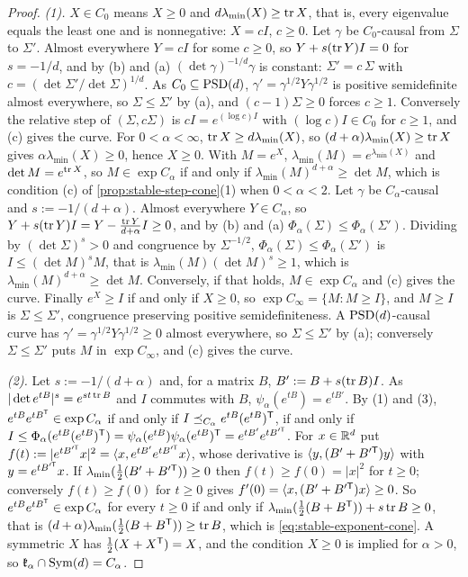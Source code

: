 \begin{proof}
\emph{(1).} $X \in C_0$ means $X \ge 0$ and $d\lambda_{\min}(X) \ge \operatorname{tr} X$, that is, every eigenvalue equals the
least one and is nonnegative: $X = cI$, $c \ge 0$. Let $\gamma$ be $C_0$-causal from $\Sigma$ to $\Sigma'$.
Almost everywhere $Y = cI$ for some $c \ge 0$, so $Y + s(\operatorname{tr} Y)I = 0$ for $s = -1/d$, and by (b) and (a)
$(\det\gamma)^{-1/d}\gamma$ is constant: $\Sigma' = c\,\Sigma$ with $c = (\det\Sigma'/\det\Sigma)^{1/d}$. As
$C_0 \subseteq \mathrm{PSD}(d)$, $\gamma' = \gamma^{1/2}Y\gamma^{1/2}$ is positive semidefinite almost everywhere, so
$\Sigma \le \Sigma'$ by (a), and $(c - 1)\Sigma \ge 0$ forces $c \ge 1$. Conversely the relative step of
$(\Sigma, c\Sigma)$ is $cI = e^{(\log c)I}$ with $(\log c)I \in C_0$ for $c \ge 1$, and (c) gives the curve.
For $0 < \alpha < \infty$, $\operatorname{tr} X \ge d\lambda_{\min}(X)$, so
$(d+\alpha)\lambda_{\min}(X) \ge \operatorname{tr} X$ gives $\alpha\lambda_{\min}(X) \ge 0$, hence $X \ge 0$. With
$M = e^X$, $\lambda_{\min}(M) = e^{\lambda_{\min}(X)}$ and $\det M = e^{\operatorname{tr} X}$, so $M \in \exp C_\alpha$ if and
only if $\lambda_{\min}(M)^{d+\alpha} \ge \det M$, which is condition (c) of \ref{prop:stable-step-cone}(1)
when $0 < \alpha < 2$. Let $\gamma$ be $C_\alpha$-causal and $s := -1/(d+\alpha)$. Almost everywhere $Y \in
C_\alpha$, so $Y + s(\operatorname{tr} Y)I = Y - \frac{\operatorname{tr} Y}{d+\alpha}I \ge 0$, and by (b) and (a) $\Phi_\alpha(\Sigma) \le
\Phi_\alpha(\Sigma')$. Dividing by $(\det\Sigma)^s > 0$ and congruence by $\Sigma^{-1/2}$, $\Phi_\alpha(\Sigma)
\le \Phi_\alpha(\Sigma')$ is $I \le (\det M)^sM$, that is $\lambda_{\min}(M)(\det M)^s \ge 1$, which is
$\lambda_{\min}(M)^{d+\alpha} \ge \det M$. Conversely, if that holds, $M \in \exp C_\alpha$ and (c) gives the
curve. Finally $e^X \ge I$ if and only if $X \ge 0$, so $\exp C_\infty = \{M : M \ge I\}$, and
$M \ge I$ is $\Sigma \le \Sigma'$, congruence preserving positive semidefiniteness. A $\mathrm{PSD}(d)$-causal curve has
$\gamma' = \gamma^{1/2}Y\gamma^{1/2} \ge 0$ almost everywhere, so $\Sigma \le \Sigma'$ by (a); conversely
$\Sigma \le \Sigma'$ puts $M$ in $\exp C_\infty$, and (c) gives the curve.

\emph{(2).} Let $s := -1/(d+\alpha)$ and, for a matrix $B$, $B' := B + s(\operatorname{tr} B)I$. As
$|\det e^{tB}|^s = e^{st\operatorname{tr} B}$ and $I$ commutes with $B$, $\psi_\alpha(e^{tB}) = e^{tB'}$. By (1) and (3),
$e^{tB}e^{tB^{\mathsf{T}}} \in \exp C_\alpha$ if and only if $I \preceq_{C_\alpha} e^{tB}(e^{tB})^{\mathsf{T}}$, if and only if
$I \le \Phi_\alpha(e^{tB}(e^{tB})^{\mathsf{T}}) = \psi_\alpha(e^{tB})\psi_\alpha(e^{tB})^{\mathsf{T}} = e^{tB'}e^{tB'^{\mathsf{T}}}$.
For $x \in \mathbb{R}^d$ put $f(t) := |e^{tB'^{\mathsf{T}}}x|^2 = \langle x, e^{tB'}e^{tB'^{\mathsf{T}}}x\rangle$, whose derivative
is $\langle y, (B' + B'^{\mathsf{T}})y\rangle$ with $y = e^{tB'^{\mathsf{T}}}x$. If $\lambda_{\min}(\frac12(B' + B'^{\mathsf{T}}))
\ge 0$ then $f(t) \ge f(0) = |x|^2$ for $t \ge 0$; conversely $f(t) \ge f(0)$ for $t \ge 0$ gives
$f'(0) = \langle x, (B' + B'^{\mathsf{T}})x\rangle \ge 0$. So $e^{tB}e^{tB^{\mathsf{T}}} \in \exp C_\alpha$ for every
$t \ge 0$ if and only if $\lambda_{\min}(\frac12(B + B^{\mathsf{T}})) + s\operatorname{tr} B \ge 0$, that is
$(d+\alpha)\lambda_{\min}(\frac12(B + B^{\mathsf{T}})) \ge \operatorname{tr} B$, which is \ref{eq:stable-exponent-cone}. A symmetric
$X$ has $\frac12(X + X^{\mathsf{T}}) = X$, and the condition $X \ge 0$ is implied for $\alpha > 0$, so
$\mathfrak k_\alpha \cap \mathrm{Sym}(d) = C_\alpha$.


\end{proof}
